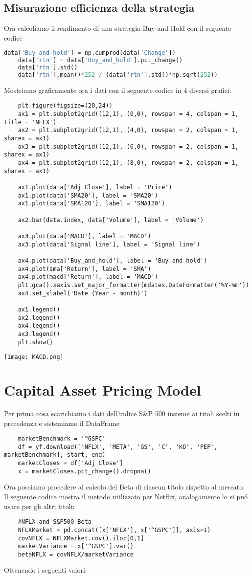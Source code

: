 \documentclass{report}
\begin{document}
\section{Misurazione efficienza della strategia}
Ora calcoliamo il rendimento di una strategia Buy-and-Hold con il seguente codice
\begin{lstlisting}[language=python]
    data['Buy_and_hold'] = np.cumprod(data['Change'])
    data['rtn'] = data['Buy_and_hold'].pct_change()
    data['rtn'].std()
    data['rtn'].mean()*252 / (data['rtn'].std()*np.sqrt(252))
\end{lstlisting}
Mostriamo graficamente ora i dati con il seguente codice in 4 diversi grafici:
\begin{lstlisting}
    plt.figure(figsize=(20,24))
    ax1 = plt.subplot2grid((12,1), (0,0), rowspan = 4, colspan = 1, title = 'NFLX')
    ax2 = plt.subplot2grid((12,1), (4,0), rowspan = 2, colspan = 1, sharex = ax1)
    ax3 = plt.subplot2grid((12,1), (6,0), rowspan = 2, colspan = 1, sharex = ax1)
    ax4 = plt.subplot2grid((12,1), (8,0), rowspan = 2, colspan = 1, sharex = ax1)
    
    ax1.plot(data['Adj Close'], label = 'Price')
    ax1.plot(data['SMA20'], label = 'SMA20')
    ax1.plot(data['SMA120'], label = 'SMA120')
    
    ax2.bar(data.index, data['Volume'], label = 'Volume')
    
    ax3.plot(data['MACD'], label = 'MACD')
    ax3.plot(data['Signal line'], label = 'Signal line')
    
    ax4.plot(data['Buy_and_hold'], label = 'Buy and hold')
    ax4.plot(sma['Return'], label = 'SMA')
    ax4.plot(macd['Return'], label = 'MACD')
    plt.gca().xaxis.set_major_formatter(mdates.DateFormatter('%Y-%m'))
    ax4.set_xlabel('Date (Year - month)')
    
    ax1.legend()
    ax2.legend()
    ax4.legend()
    ax3.legend()
    plt.show()
\end{lstlisting}

\texttt{[image: MACD.png]}

\chapter{Capital Asset Pricing Model}
Per prima cosa scarichiamo i dati dell'indice S&P 500 insieme ai titoli scelti in precedenza e sistemiamo il DataFrame
\begin{lstlisting}
    marketBenchmark = '^GSPC'
    df = yf.download(['NFLX', 'META', 'GS', 'C', 'KO', 'PEP', marketBenchmark], start, end)
    marketCloses = df['Adj Close']
    x = marketCloses.pct_change().dropna()
\end{lstlisting}
Ora possiamo procedere al calcolo del Beta di ciascun titolo rispetto al mercato. Il seguente codice mostra il metodo utilizzato per Netflix, analogamente lo si puó usare per gli altri titoli:
\begin{lstlisting}
    #NFLX and S&P500 Beta
    NFLXMarket = pd.concat([x['NFLX'], x['^GSPC']], axis=1)
    covNFLX = NFLXMarket.cov().iloc[0,1]
    marketVariance = x['^GSPC'].var()
    betaNFLX = covNFLX/marketVariance
\end{lstlisting}
Ottenendo i seguenti valori: 
\end{document}
